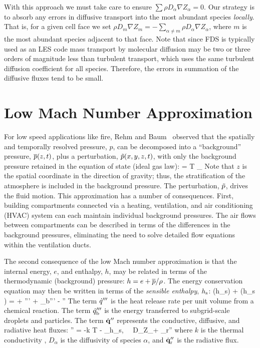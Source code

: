 With this approach we must take care to ensure $\sum \rho D_\alpha \nabla Z_\alpha = 0$.  Our strategy is to absorb any errors in diffusive transport into the most abundant species \emph{locally}.  That is, for a given cell face we set $\rho D_m \nabla Z_m = -\sum_{\alpha\ne m} \rho D_\alpha \nabla Z_\alpha$, where $m$ is the most abundant species adjacent to that face.  Note that since FDS is typically used as an LES code mass transport by molecular diffusion may be two or three orders of magnitude less than turbulent transport, which uses the same turbulent diffusion coefficient for all species. Therefore, the errors in summation of the diffusive fluxes tend to be small.

\section{Low Mach Number Approximation}

For low speed applications like fire, Rehm and Baum~\cite{Rehm:1} observed that the spatially and temporally resolved pressure, $p$, can be decomposed into a ``background'' pressure, $\overline{p}(z,t)$, plus a perturbation, $\tilde{p}(x,y,z,t)$, with only the background pressure retained in the equation of state (ideal gas law):
\be \bp = \rho T \R \sum_\alpha  {} \equiv {}  \label{basicstate1} \ee
Note that $z$ is the spatial coordinate in the direction of gravity; thus, the stratification of the atmosphere is included in the background pressure. The perturbation, $\tilde{p}$, drives the fluid motion. This approximation has a number of consequences. First, building compartments connected via a heating, ventilation, and air conditioning (HVAC) system can each maintain individual background pressures. The air flows between compartments can be
described in terms of the differences in the background pressures, eliminating the need to solve detailed flow equations within the ventilation ducts.

The second consequence of the low Mach number approximation is that the internal energy, $e$, and enthalpy, $h$, may be related in terms of the thermodynamic (background) pressure: $h = e + \overline{p}/\rho$.  The energy conservation equation may then be written in terms of the {\em sensible enthalpy}, $h_{\rm s}$:
\be {}(\rho h_{\rm s}) + \nabla\!\cdot (\rho h_{\rm s} \bu) =  + \dq''' + \dq_{\rm b}''' - \nabla\!\cdot \dbq'' \label{energy} 
\ee
The term $\dot{q}'''$ is the heat release rate per unit volume from a chemical reaction. The term $\dot{q}_{\rm b}'''$ is the energy transferred to subgrid-scale droplets and particles. The term $\dot{\mathbf{q}}''$ represents the conductive, diffusive, and radiative heat fluxes:
\be
   \dbq'' = -k \nabla T - \sum_\alpha h_{\rm s,\alpha} \, \rho \, D_\alpha \nabla Z_\alpha + \dbq_{\rm r}''  \label{bqdot_def}
\ee
where $k$ is the thermal conductivity , $D_\alpha$ is the diffusivity of species $\alpha$, and $\dot{\mathbf{q}}_{\rm r}''$ is the radiative flux.

